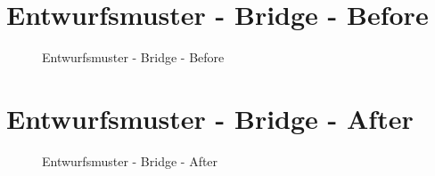 %	
%
\section{Entwurfsmuster - Bridge - Before} \label{a.5.bridge.before}
\begin{figure}[h]
	\centering
	\caption{Entwurfsmuster - Bridge - Before}
	\label{a.1.aggregate}
\end{figure}

\newpage

\section{Entwurfsmuster - Bridge - After} \label{a.5.bridge.after}
\begin{figure}[h]
	\centering
	\caption{Entwurfsmuster - Bridge - After}
	\label{a.1.aggregate}
\end{figure}